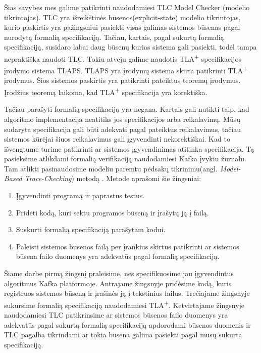 \documentclass{VUMIFPSmagistrinis}
\begin{document}
	Šias savybes mes galime patikrinti naudodamiesi TLC Model Checker (modelio tikrintojas).
		TLC yra išreikštinės būsenos(explicit-state) modelio tikrintojas, kurio paskirtis yra pažingsniui pasiekti visas galimas sistemos būsenas pagal nurodytą formalią specifikaciją.
		Tačiau, kartais, pagal sukurtą formalią specifikaciją, susidaro labai daug būsenų kurias sistema gali pasiekti, todėl tampa nepraktiška naudoti TLC.
		Tokiu atveju galime naudotis TLA\textsuperscript{+} specifikacijos įrodymo sistema TLAPS.
		TLAPS yra įrodymų sistema skirta patikrinti TLA\textsuperscript{+} įrodymus.
		Šios sistemos paskirtis yra patikrinti pateiktus teoremų įrodymus.
		Įrodžius teoremą laikoma, kad TLA\textsuperscript{+} specifikacija yra korektiška.


		Tačiau parašyti formalią specifikaciją yra negana.
		Kartais gali nutikti taip, kad algoritmo implementacija neatitiks jos specifikacijos arba reikalavimų.
		Mūsų sudaryta specifikacija gali būti adekvati pagal pateiktus reikalavimus, tačiau sistemos kūrėjai šiuos reikalavimus gali įgyvendinti nekorektiškai.
		Kad to išvengtume turime patikrinti ar sistemos įgyvendinimas atitinka specifikacija.
		Tą pasieksime atlikdami formalią verifikaciją naudodamiesi Kafka įvykiu žurnalu.
		Tam atlikti pasinaudosime modeliu paremtu pėdsakų tikrinimu(angl. {\it Model-Based Trace-Checking}) metodą \cite{ltx}.
		Metode aprašomi šie žingsniai:
		\begin{enumerate}
			\item{Įgyvendinti programą ir paprastus testus.}
			\item{Pridėti kodą, kuri sektu programos būseną ir įrašytų ją į failą.}
			\item{Suskurti formalią specifikaciją parašytam kodui.}
			\item{Paleisti sistemos būsenos failą per įrankius skirtus patikrinti ar sistemos būsena failo duomenys yra adekvatūs pagal formalią specifikaciją.}
		\end{enumerate}

		Šiame darbe pirmą žingsnį praleisime, nes specifikuosime jau įgyvendintus algoritmus Kafka platformoje.
		Antrajame žingsnyje pridėsime kodą, kuris registruos sistemos būseną ir įrašinės ją į tekstinius failus.
		Trečiajame žingsnyje sukursime formalią specifikaciją naudodamiesi TLA\textsuperscript{+}.
		Ketvirtajame žingsnyje naudodamiesi TLC patikrinsime ar sistemos būsenos failo duomenys yra adekvatūs pagal sukurtą formalią specifikaciją apdorodami būsenos duomenis ir TLC pagalba tikrindami ar tokia būsena galima pasiekti pagal mūsų sukurta specifikaciją.
\end{document}
